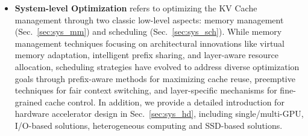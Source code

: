 \begin{itemize}[leftmargin=8pt]
    \item \textbf{System-level Optimization} refers to optimizing the KV Cache management through two classic low-level aspects: memory management (Sec.~\ref{sec:sys_mm}) and scheduling (Sec.~\ref{sec:sys_sch}). 
    While memory management techniques focusing on architectural innovations like virtual memory adaptation, intelligent prefix sharing, and layer-aware resource allocation, scheduling strategies have evolved to address diverse optimization goals through prefix-aware methods for maximizing cache reuse, preemptive techniques for fair context switching, and layer-specific mechanisms for fine-grained cache control.
    In addition, we provide a detailed introduction for hardware accelerator design in Sec.~\ref{sec:sys_hd}, including single/multi-GPU, I/O-based solutions, heterogeneous computing and SSD-based solutions.
\end{itemize}

